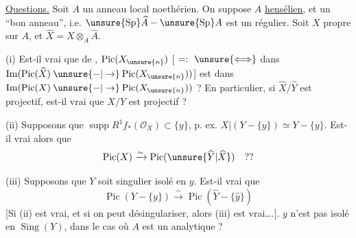 \uline{Questions.}  Soit $A$ un anneau local  noethérien. On suppose $A$ \uline{hensélien}, et un ``bon anneau'', i.e. $\unsure{\operatorname{Sp}}\widehat A-\unsure{\operatorname{Sp}}A$ est  un  régulier. Soit $X$ propre sur $A$, et $\widehat X=X\otimes_A\widehat A$.

(i) Est-il vrai que  de \unsure{--}, $\operatorname{Pic}(X_{\unsure{n}})$  [ $=:\ \unsure{\Longleftrightarrow}$  dans $\operatorname{Im}(\operatorname{Pic}(\widehat X)\mathbin{\unsure{-|\to}}\operatorname{Pic}(X_{\unsure{n}}))$] est dans $\operatorname{Im}(\operatorname{Pic}(X)\mathbin{\unsure{-|\to}}\operatorname{Pic}(X_{\unsure{n}}))$ ? En particulier, si $\widehat X/\widehat Y$ est projectif, est-il vrai que $X/Y$ est projectif ?

(ii) Supposons que $\operatorname{supp}R^1f_*(\mathcal O_X)\subset\{y\}$,  p. ex. $X|(Y-\{y\})\simeq Y-\{y\}$. Est-il vrai alors que
\[
\operatorname{Pic}(X)\xrightarrow{\sim}\operatorname{Pic}(\unsure{\widehat Y|\widehat X})\quad ??
\]

(iii) Supposons que $Y$ soit  singulier isolé en $y$. Est-il vrai que
\[
\operatorname{Pic}(Y-\{y\})\xrightarrow{\sim}\operatorname{Pic}(\widehat Y-\{\widehat y\})
\]
[Si (ii) est vrai, et si on peut désingulariser, alors (iii) est vrai\ldots.].  $y$ n'est pas isolé en $\operatorname{Sing}(Y)$, dans le cas où $A$ est un  analytique ?
